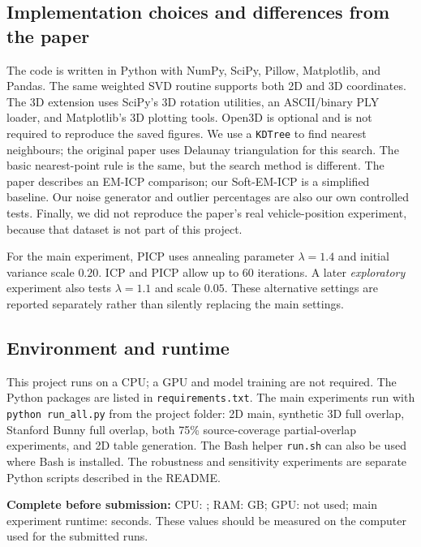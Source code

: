 \documentclass[11pt,a4paper]{article}
\begin{document}
\subsection{Implementation choices and differences from the paper}
The code is written in Python with NumPy, SciPy, Pillow, Matplotlib, and Pandas.
The same weighted SVD routine supports both 2D and 3D coordinates. The 3D
extension uses SciPy's 3D rotation utilities, an ASCII/binary PLY loader,
and Matplotlib's 3D plotting tools. Open3D is optional and is not required
to reproduce the saved figures.
We use a \texttt{KDTree} to find nearest neighbours; the original paper uses
Delaunay triangulation for this search. The basic nearest-point rule is the
same, but the search method is different. The paper describes an EM-ICP
comparison; our Soft-EM-ICP is a simplified baseline. Our noise generator and
outlier percentages are also our own controlled tests. Finally, we did not
reproduce the paper's real vehicle-position experiment, because that dataset
is not part of this project.

For the main experiment, PICP uses annealing parameter $\lambda=1.4$ and initial
variance scale $0.20$. ICP and PICP allow up to 60 iterations. A later
\emph{exploratory} experiment also tests $\lambda=1.1$ and scale $0.05$.
These alternative settings are reported separately rather than silently
replacing the main settings.

\subsection{Environment and runtime}
This project runs on a CPU; a GPU and model training are not required.
The Python packages are listed in \texttt{requirements.txt}. The main experiments run with \texttt{python run\_all.py} from the project folder:
2D main, synthetic 3D full overlap, Stanford Bunny full overlap, both 75\%
source-coverage partial-overlap experiments, and 2D table generation.
The Bash helper \texttt{run.sh} can also be used where Bash is installed.
The robustness and
sensitivity experiments are separate Python scripts described in the README.

\textbf{Complete before submission:} CPU: \underline{\hspace{38mm}};
RAM: \underline{\hspace{20mm}} GB;
GPU: not used;
main experiment runtime: \underline{\hspace{20mm}} seconds.
These values should be measured on the computer used for the submitted runs.
\end{document}
